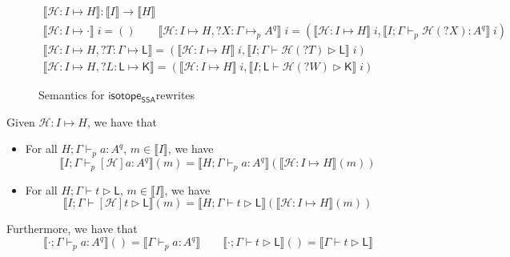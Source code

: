 \documentclass[acmsmall,screen,review]{acmart}
\newcommand{\mc}[1]{\ensuremath{\mathcal{#1}}}
\newcommand{\ms}[1]{\ensuremath{\mathsf{#1}}}
\newcommand{\hasty}[5]{#1 \vdash_{#2} #3: {#4}^{#5}}
\newcommand{\haslb}[3]{#1 \vdash #2 \rhd #3}
\newcommand{\lhole}[1]{?#1}
\newcommand{\mhasty}[6]{#1;#2 \vdash_{#3} #4: {#5}^{#6}}
\newcommand{\mhaslb}[4]{#1;#2 \vdash #3 \rhd #4}
\newcommand{\mlhaslb}[4]{#1;#2 \vdash #3 \rhd #4}
\newcommand{\tyhole}[5]{#1: #2 \mapsto_{#3} {#4}^{#5}}
\newcommand{\blkhole}[3]{#1: #2 \mapsto #3}
\newcommand{\cfghole}[3]{#1: #2 \mapsto #3}
\newcommand{\isrw}[3]{#1: #2 \mapsto #3}
\newcommand{\dnt}[1]{\llbracket{#1}\rrbracket}
\newcommand{\isotopessa}{\ms{isotope_{SSA}}}
\begin{document}
\begin{figure}
  \begin{gather*}
    \boxed{
      \dnt{\isrw{\mc{H}}{I}{H}}
      : \dnt{I} \to \dnt{H} 
    }
    \\
    \dnt{\isrw{\mc{H}}{I}{\cdot}}\;i = ()
    \qquad
    \dnt{\isrw{\mc{H}}{I}{H, \tyhole{\lhole{X}}{\Gamma}{p}{A}{q}}}\;i
    = (\dnt{\isrw{\mc{H}}{I}{H}}\;i, \dnt{\mhasty{I}{\Gamma}{p}{\mc{H}(\lhole{X})}{A}{q}}\;i)
    \\
    \dnt{\isrw{\mc{H}}{I}{H, \blkhole{\lhole{T}}{\Gamma}{\ms{L}}}}
    = (\dnt{\isrw{\mc{H}}{I}{H}}\;i, \dnt{\mhaslb{I}{\Gamma}{\mc{H}(\lhole{T})}{\ms{L}}}\;i)
    \\
    \dnt{\isrw{\mc{H}}{I}{H, \cfghole{\lhole{L}}{\ms{L}}{\ms{K}}}}
    = (\dnt{\isrw{\mc{H}}{I}{H}}\;i, \dnt{\mlhaslb{I}{\ms{L}}{\mc{H}(\lhole{W})}{\ms{K}}}\;i)
  \end{gather*}
  \caption{Semantics for \isotopessa rewrites}
  \label{fig:rewrite-semantics}
\end{figure}


\begin{theorem}
  Given \(\isrw{\mc{H}}{I}{H}\), we have that
  \begin{itemize}
    \item For all \(\mhasty{H}{\Gamma}{p}{a}{A}{q}\), \(m \in \dnt{I}\), we have
    \[
      \dnt{\mhasty{I}{\Gamma}{p}{[\mc{H}]a}{A}{q}}(m)
      = \dnt{\mhasty{H}{\Gamma}{p}{a}{A}{q}}(\dnt{\isrw{\mc{H}}{I}{H}}(m))
    \]
    \item For all \(\mhaslb{H}{\Gamma}{t}{\ms{L}}\), \(m \in \dnt{I}\), we have
    \[
      \dnt{\mhaslb{I}{\Gamma}{[\mc{H}]t}{\ms{L}}}(m)
      = \dnt{\mhaslb{H}{\Gamma}{t}{\ms{L}}}(\dnt{\isrw{\mc{H}}{I}{H}}(m))
    \]
  \end{itemize}

  Furthermore, we have that
  \[
    \dnt{\mhasty{\cdot}{\Gamma}{p}{a}{A}{q}}() = \dnt{\hasty{\Gamma}{p}{a}{A}{q}}
    \qquad
    \dnt{\mhaslb{\cdot}{\Gamma}{t}{\ms{L}}}() = \dnt{\haslb{\Gamma}{t}{\ms{L}}}
  \]
\end{theorem}
\end{document}
